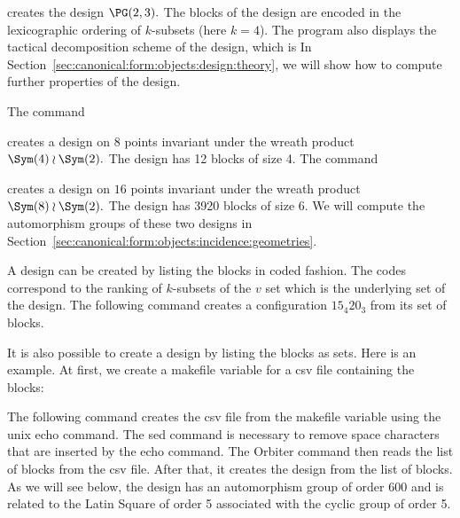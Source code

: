
creates the design $\PG(2,3).$ 
The blocks of the design are encoded in the lexicographic ordering of $k$-subsets (here $k=4$).
The program also displays the tactical decomposition scheme of the design, which is
In Section~\ref{sec:canonical:form:objects:design:theory}, we will show how to compute 
further properties of the design.


\bigskip

The command 


creates a design on $8$ points invariant under the wreath product $\Sym(4) \wr \Sym(2).$
The design has 12 blocks of size 4. 
The command 


creates a design on $16$ points invariant under 
the wreath product $\Sym(8) \wr \Sym(2).$
The design has 3920 blocks of size 6. 
We will compute the automorphism groups of these 
two designs in Section~\ref{sec:canonical:form:objects:incidence:geometries}.



\bigskip

A design can be created by listing the blocks in coded fashion. 
The codes correspond to the 
ranking of $k$-subsets of the $v$ set which is the underlying set of the design. 
The following command creates a configuration $15_4 20_3$ from its set of blocks. 





\bigskip

It is also possible to create a design by listing the blocks as sets. 
Here is an example. At first, we create a makefile variable 
for a csv file containing the blocks:


The following command creates the csv file from the makefile variable using the unix echo command. 
The sed command is necessary to remove space characters that are inserted by the echo command.
The Orbiter command then reads the list of blocks from the csv file. 
After that, it creates the design from the list of blocks. 
As we will see below, the design has an automorphism group of order 600 
and is related to the Latin Square of order 5 associated with the cyclic group of order 5. 

